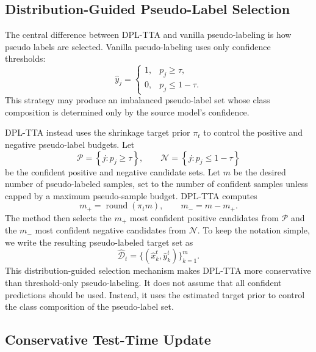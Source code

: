 \documentclass{article}
\begin{document}
\subsection{Distribution-Guided Pseudo-Label Selection}

The central difference between DPL-TTA and vanilla pseudo-labeling is how pseudo labels are selected. Vanilla pseudo-labeling uses only confidence thresholds:
\begin{equation}
\hat{y}_j =
\begin{cases}
1, & p_j \geq \tau, \\
0, & p_j \leq 1-\tau.
\end{cases}
\label{eq:threshold_pseudo_label}
\end{equation}
This strategy may produce an imbalanced pseudo-label set whose class composition is determined only by the source model's confidence.

DPL-TTA instead uses the shrinkage target prior $\pi_t$ to control the positive and negative pseudo-label budgets. Let
\begin{equation}
\mathcal{P}
=
\left\{j : p_j \geq \tau\right\},
\qquad
\mathcal{N}
=
\left\{j : p_j \leq 1-\tau\right\}
\label{eq:candidate_sets}
\end{equation}
be the confident positive and negative candidate sets. Let $m$ be the desired number of pseudo-labeled samples, set to the number of confident samples unless capped by a maximum pseudo-sample budget. DPL-TTA computes
\begin{equation}
m_+
=
\operatorname{round}(\pi_t m),
\qquad
m_-
=
m - m_+ .
\label{eq:pseudo_label_budgets}
\end{equation}
The method then selects the $m_+$ most confident positive candidates from $\mathcal{P}$ and the $m_-$ most confident negative candidates from $\mathcal{N}$. To keep the notation simple, we write the resulting pseudo-labeled target set as
\begin{equation}
\hat{\mathcal{D}}_{t}
=
\{(\hat{x}_k^{t}, \hat{y}_k^{t})\}_{k=1}^{m}.
\label{eq:pseudo_labeled_set}
\end{equation}
This distribution-guided selection mechanism makes DPL-TTA more conservative than threshold-only pseudo-labeling. It does not assume that all confident predictions should be used. Instead, it uses the estimated target prior to control the class composition of the pseudo-label set.

\subsection{Conservative Test-Time Update}
\end{document}
